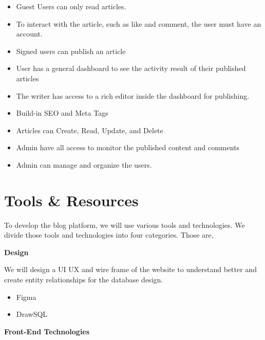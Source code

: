 \documentclass{article}
\begin{document}
\begin{itemize}
    \item  Guest Users can only read articles.

    \item  To interact with the article, such as like and comment, the user must have an account.
    
    \item  Signed users can publish an article
    
    \item  User has a general dashboard to see the activity result of their published articles
    
    \item  The writer has access to a rich editor inside the dashboard for publishing.
    
    \item  Build-in SEO and Meta Tags
    
    \item  Articles can Create, Read, Update, and Delete
    
    \item  Admin have all access to monitor the published content and comments
    
    \item  Admin can manage and organize the users.
\end{itemize}


\noindent 


\noindent \section{Tools \& Resources}

\noindent To develop the blog platform, we will use various tools and technologies. We divide those tools and technologies into four categories. Those are,

\noindent 

\noindent \textbf{Design}

\noindent We will design a UI UX and wire frame of the website to understand better and create entity relationships for the database design.

\begin{itemize}
    \item Figma
    \item DrawSQL
\end{itemize}

\noindent 

\noindent \textbf{Front-End Technologies}
\end{document}
